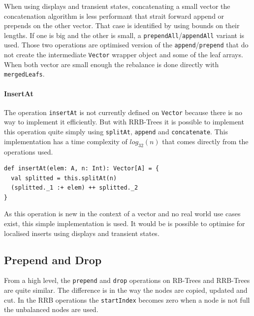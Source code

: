 When using displays and transient states, concatenating a small vector the concatenation algorithm is less performant that strait forward append or prepends on the other vector. That case is identified by using bounds on their lengths. If one is big and the other is small, a \texttt{prependAll}/\texttt{appendAll} variant is used. Those two operations are optimised version of the \texttt{append}/\texttt{prepend} that do not create the intermediate \texttt{Vector} wrapper object and some of the leaf arrays. When both vector are small enough the rebalance is done directly with \texttt{mergedLeafs}.

\paragraph{InsertAt}
The operation \texttt{insertAt} is not currently defined on \texttt{Vector} because there is no way to implement it efficiently. But with RRB-Trees it is possible to implement this operation quite simply using \texttt{splitAt}, \texttt{append} and \texttt{concatenate}. This implementation has a time complexity of $log_{32}(n)$ that comes directly from the operations used.

\begin{lstlisting}[frame=single]
def insertAt(elem: A, n: Int): Vector[A] = {
  val splitted = this.splitAt(n)
  (splitted._1 :+ elem) ++ splitted._2
}
\end{lstlisting}

As this operation is new in the context of a vector and no real world use cases exist, this simple implementation is used. It would be is possible to optimise for localised inserts using displays and transient states.

\subsection{Prepend and Drop}
From a high level, the \texttt{prepend} and \texttt{drop} operations on RB-Trees and RRB-Trees are quite similar. The difference is in the way the nodes are copied, updated and cut. In the RRB operations the \texttt{startIndex} becomes zero when a node is not full the unbalanced nodes are used.

